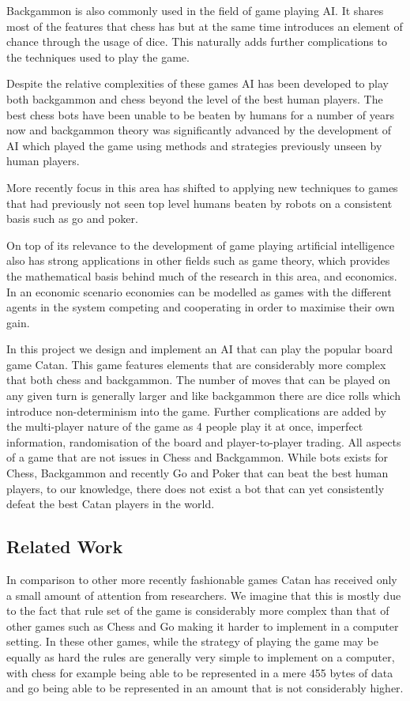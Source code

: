 \documentclass[]{article}
\begin{document}
\par Backgammon is also commonly used in the field of game playing AI. It shares most of the features that chess has but at the same time introduces an element of chance through the usage of dice. This naturally adds further complications to the techniques used to play the game.

\par Despite the relative complexities of these games AI has been developed to play both backgammon and chess beyond the level of the best human players. The best chess bots have been unable to be beaten by humans for a number of years now and backgammon theory was significantly advanced by the development of AI which played the game using methods and strategies previously unseen by human players.

\par More recently focus in this area has shifted to applying new techniques to games that had previously not seen top level humans beaten by robots on a consistent basis such as go and poker.

\par On top of its relevance to the development of game playing artificial intelligence also has strong applications in other fields such as game theory, which provides the mathematical basis behind much of the research in this area, and economics. In an economic scenario economies can be modelled as games with the different agents in the system competing and cooperating in order to maximise their own gain.

\par In this project we design and implement an AI that can play the popular board game Catan. This game features elements that are considerably more complex that both chess and backgammon. The number of moves that can be played on any given turn is generally larger and like backgammon there are dice rolls which introduce non-determinism into the game. Further complications are added by the multi-player nature of the game as 4 people play it at once, imperfect information, randomisation of the board and player-to-player trading. All aspects of a game that are not issues in Chess and Backgammon. While bots exists for Chess, Backgammon and recently Go and Poker that can beat the best human players, to our knowledge, there does not exist a bot that can yet consistently defeat the best Catan players in the world.
 
\subsection{Related Work}
In comparison to other more recently fashionable games Catan has received only a small amount of attention from researchers. We imagine that this is mostly due to the fact that rule set of the game is considerably more complex than that of other games such as Chess and Go making it harder to implement in a computer setting. In these other games, while the strategy of playing the game may be equally as hard the rules are generally very simple to implement on a computer, with chess for example being able to be represented in a mere 455 bytes of data and go being able to be represented in an amount that is not considerably higher.
\end{document}
